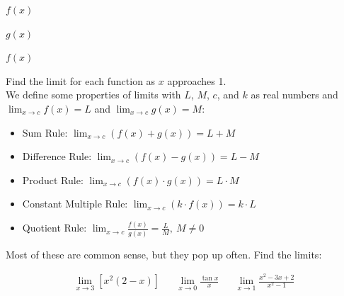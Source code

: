 \documentclass[11pt]{article}
\begin{document}
    \vspace{1ex}

    \begin{center}
        \begin{minipage}{0.32\textwidth}
            \centering $\displaystyle f(x)$\\[1ex]
            \smallgraph
        \end{minipage}
        \begin{minipage}{0.32\textwidth}
            \centering $\displaystyle g(x)$\\[1ex]
            \smallgraph
        \end{minipage}
        \begin{minipage}{0.32\textwidth}
            \centering $\displaystyle f(x)$\\[1ex]
            \smallgraph
        \end{minipage}
    \end{center}

    \noindent Find the limit for each function as $\displaystyle x$ approaches 1.\\[2ex]

    \noindent We define some properties of limits with $\displaystyle L$, $\displaystyle M$, $\displaystyle c$, and $\displaystyle k$ as real numbers and $\displaystyle \lim_{x\to c} f(x) = L$ and $\displaystyle \lim_{x\to c} g(x) = M$:
    \begin{itemize}
        \item Sum Rule: $\displaystyle \lim_{x\to c}(f(x) + g(x)) = L + M$
        \item Difference Rule: $\displaystyle \lim_{x\to c}(f(x) - g(x)) = L - M$
        \item Product Rule: $\displaystyle \lim_{x\to c}(f(x) \cdot g(x)) = L \cdot M$
        \item Constant Multiple Rule: $\displaystyle \lim_{x\to c}(k \cdot f(x)) = k \cdot L$
        \item Quotient Rule: $\displaystyle \lim_{x\to c}\frac{f(x)}{g(x)} = \frac{L}{M},\ M \neq 0$
    \end{itemize}

    \vspace{2ex}

    \noindent Most of these are common sense, but they pop up often. Find the limits:

    \begin{align*}
        \lim_{x\to3}[x^2(2-x)] &  & \lim_{x\to0}\frac{\tan x}{x} &  & \lim_{x\to1}\frac{x^2 - 3x + 2}{x^2 - 1}
    \end{align*}\\[2ex]
\end{document}
